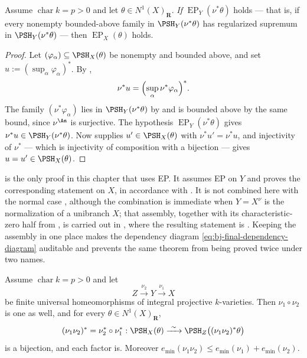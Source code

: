 \begin{corollary}
\label{cor:ch43-ep-transport}
Assume $\operatorname{char}k=p>0$ and let $\theta\in N^1(X)_{\mathbf R}$.
\emph{If} $\operatorname{EP}_Y(\nu^*\theta)$ holds --- that is, if every
nonempty bounded-above family in $\PSH_Y(\nu^*\theta)$ has regularized
supremum in $\PSH_Y(\nu^*\theta)$ --- then
$\operatorname{EP}_X(\theta)$ holds.
\end{corollary}

\begin{proof}
Let $(\varphi_\alpha)\subseteq\PSH_X(\theta)$ be nonempty and bounded
above, and set $u:=(\sup_\alpha\varphi_\alpha)^*$.  By
,
\[
 \nu^*u=\Bigl(\sup_\alpha\nu^*\varphi_\alpha\Bigr)^* .
\]
The family $(\nu^*\varphi_\alpha)$ lies in $\PSH_Y(\nu^*\theta)$ by
 and is bounded above by the same bound, since
$\nu^{\An}$ is surjective.  The hypothesis
$\operatorname{EP}_Y(\nu^*\theta)$ gives
$\nu^*u\in\PSH_Y(\nu^*\theta)$.  Now
 supplies
$u'\in\PSH_X(\theta)$ with $\nu^*u'=\nu^*u$, and injectivity of
$\nu^*$ --- which is injectivity of composition with a bijection --- gives
$u=u'\in\PSH_X(\theta)$.
\end{proof}

\begin{remark}
\label{rem:ch43-ep-conditional}
 is the only proof in this chapter that
uses EP.  It assumes EP on $Y$ and proves the corresponding statement
on $X$, in accordance with .  It is not combined here with the
normal case , although the combination is
immediate when $Y=X^\nu$ is the normalization of a unibranch $X$; that
assembly, together with its characteristic-zero half from
, is carried out in
, where the resulting statement is
.  Keeping the assembly in one place makes the
dependency diagram \eqref{eq:bj-final-dependency-diagram} auditable and
prevents the same theorem from being proved twice under two names.
\end{remark}

\begin{corollary}
\label{cor:ch43-reflection-tower}
Assume $\operatorname{char}k=p>0$ and let
\[
 Z\xrightarrow{\ \nu_2\ }Y\xrightarrow{\ \nu_1\ }X
\]
be finite universal homeomorphisms of integral projective $k$-varieties.
Then $\nu_1\circ\nu_2$ is one as well, and for every
$\theta\in N^1(X)_{\mathbf R}$,
\[
 (\nu_1\nu_2)^*=\nu_2^*\circ\nu_1^*:
 \PSH_X(\theta)\xrightarrow{\ \sim\ }\PSH_Z\bigl((\nu_1\nu_2)^*\theta\bigr)
\]
is a bijection, and each factor is.  Moreover
$e_{\min}(\nu_1\nu_2)\le e_{\min}(\nu_1)+e_{\min}(\nu_2)$.
\end{corollary}

